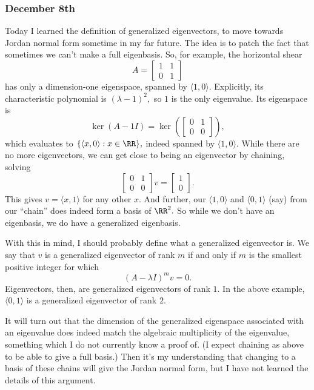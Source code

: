 \subsubsection{December 8th}
Today I learned the definition of generalized eigenvectors, to move towards Jordan normal form sometime in my far future. The idea is to patch the fact that sometimes we can't make a full eigenbasis. So, for example, the horizontal shear
\[A=\begin{bmatrix}
    1 & 1 \\
    0 & 1
\end{bmatrix}\]
has only a dimension-one eigenspace, spanned by $\langle1,0\rangle.$ Explicitly, its characteristic polynomial is $(\lambda-1)^2,$ so $1$ is the only eigenvalue. Its eigenspace is
\[\ker(A-1I)=\ker\left(\begin{bmatrix}
    0 & 1 \\
    0 & 0
\end{bmatrix}\right),\]
which evaluates to $\{\langle x,0\rangle:x\in\RR\},$ indeed spanned by $\langle1,0\rangle.$ While there are no more eigenvectors, we can get close to being an eigenvector by chaining, solving
\[\begin{bmatrix}
    0 & 1 \\
    0 & 0
\end{bmatrix}v=\begin{bmatrix} 1 \\ 0 \end{bmatrix}.\]
This gives $v=\langle x,1\rangle$ for any other $x.$ And further, our $\langle1,0\rangle$ and $\langle0,1\rangle$ (say) from our ``chain'' does indeed form a basis of $\RR^2.$ So while we don't have an eigenbasis, we do have a generalized eigenbasis.

With this in mind, I should probably define what a generalized eigenvector is. We say that $v$ is a generalized eigenvector of rank $m$ if and only if $m$ is the smallest positive integer for which
\[(A-\lambda I)^mv=0.\]
Eigenvectors, then, are generalized eigenvectors of rank $1.$ In the above example, $\langle0,1\rangle$ is a generalized eigenvector of rank $2.$

It will turn out that the dimension of the generalized eigenspace associated with an eigenvalue does indeed match the algebraic multiplicity of the eigenvalue, something which I do not currently know a proof of. (I expect chaining as above to be able to give a full basis.) Then it's my understanding that changing to a basis of these chains will give the Jordan normal form, but I have not learned the details of this argument.

